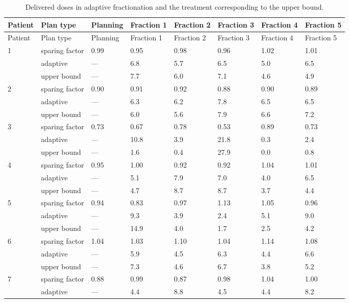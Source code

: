 \documentclass[11pt]{article}
\newcommand{\toprule}{\hline}
\newcommand{\midrule}{\hline}
\begin{document}
\setlength{\LTleft}{0pt}
\setlength{\LTright}{0pt}
\small
\begin{longtable}{llllllll}
\caption{Delivered doses in adaptive fractionation and the treatment corresponding to the upper bound.}
\label{tab:appendix-doses}\\
\toprule
Patient & Plan type & Planning & Fraction 1 & Fraction 2 & Fraction 3 & Fraction 4 & Fraction 5 \\
\midrule
\endfirsthead
\toprule
Patient & Plan type & Planning & Fraction 1 & Fraction 2 & Fraction 3 & Fraction 4 & Fraction 5 \\
\midrule
\endhead
1 & sparing factor & 0.99 & 0.95 & 0.98 & 0.96 & 1.02 & 1.01 \\
  & adaptive & --- & 6.8 & 5.7 & 6.5 & 5.0 & 6.5 \\
  & upper bound & --- & 7.7 & 6.0 & 7.1 & 4.6 & 4.9 \\
\midrule
2 & sparing factor & 0.90 & 0.91 & 0.92 & 0.88 & 0.90 & 0.89 \\
  & adaptive & --- & 6.3 & 6.2 & 7.8 & 6.5 & 6.5 \\
  & upper bound & --- & 6.0 & 5.6 & 7.9 & 6.6 & 7.2 \\
\midrule
3 & sparing factor & 0.73 & 0.67 & 0.78 & 0.53 & 0.89 & 0.73 \\
  & adaptive & --- & 10.8 & 3.9 & 21.8 & 0.3 & 2.4 \\
  & upper bound & --- & 1.6 & 0.4 & 27.9 & 0.0 & 0.8 \\
\midrule
4 & sparing factor & 0.95 & 1.00 & 0.92 & 0.92 & 1.04 & 1.01 \\
  & adaptive & --- & 5.1 & 7.9 & 7.0 & 4.0 & 6.5 \\
  & upper bound & --- & 4.7 & 8.7 & 8.7 & 3.7 & 4.4 \\
\midrule
5 & sparing factor & 0.94 & 0.83 & 0.97 & 1.13 & 1.05 & 0.96 \\
  & adaptive & --- & 9.3 & 3.9 & 2.4 & 5.1 & 9.0 \\
  & upper bound & --- & 14.9 & 4.0 & 1.7 & 2.5 & 4.2 \\
\midrule
6 & sparing factor & 1.04 & 1.03 & 1.10 & 1.04 & 1.14 & 1.08 \\
  & adaptive & --- & 5.9 & 4.5 & 6.3 & 4.4 & 6.6 \\
  & upper bound & --- & 7.3 & 4.6 & 6.7 & 3.8 & 5.2 \\
\midrule
7 & sparing factor & 0.88 & 0.99 & 0.87 & 0.98 & 1.04 & 1.00 \\
  & adaptive & --- & 4.4 & 8.8 & 4.5 & 4.4 & 8.2 \\

\end{longtable}
\end{document}

